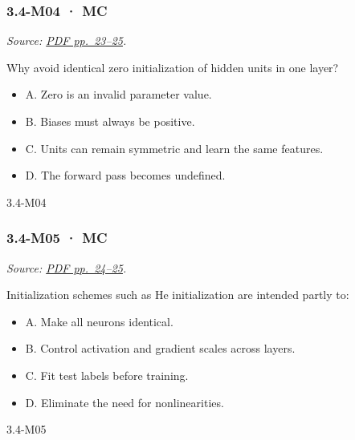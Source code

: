 \noindent\begin{minipage}{\linewidth}

\subsubsection{3.4-M04 · MC}\label{m04-mc-10}

\emph{Source:
\href{../Lecture\%20Slides/3.4.\%20Deep\%20Learning\%20Fundamentals\%20II.pdf\#page=23}{PDF
pp.~23--25}.}

Why avoid identical zero initialization of hidden units in one layer?

\begin{itemize}
\tightlist
\item
  A. Zero is an invalid parameter value.
\item
  B. Biases must always be positive.
\item
  C. Units can remain symmetric and learn the same features.
\item
  D. The forward pass becomes undefined.
\end{itemize}

\begin{solution}[8mm]{3.4-M04}

\end{solution}
\end{minipage}\par\medskip

\noindent\begin{minipage}{\linewidth}

\subsubsection{3.4-M05 · MC}\label{m05-mc-10}

\emph{Source:
\href{../Lecture\%20Slides/3.4.\%20Deep\%20Learning\%20Fundamentals\%20II.pdf\#page=24}{PDF
pp.~24--25}.}

Initialization schemes such as He initialization are intended partly to:

\begin{itemize}
\tightlist
\item
  A. Make all neurons identical.
\item
  B. Control activation and gradient scales across layers.
\item
  C. Fit test labels before training.
\item
  D. Eliminate the need for nonlinearities.
\end{itemize}

\begin{solution}[8mm]{3.4-M05}

\end{solution}
\end{minipage}\par\medskip

